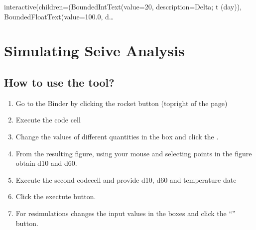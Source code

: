 \documentclass[letterpaper,10pt,english]{sphinxmanual}
\begin{document}
\begin{sphinxVerbatim}[commandchars=\\\{\}]
          
  \PYG{p}{[}\PYG{p}{]}  
\end{sphinxVerbatim}

\begin{sphinxVerbatim}[commandchars=\\\{\}]
interactive(children=(BoundedIntText(value=20, description=\PYGZsq{}\PYGZam{}Delta; t (day)\PYGZsq{}), BoundedFloatText(value=100.0, d…
\end{sphinxVerbatim}


\section{Simulating Seive Analysis}
\label{\detokenize{contents/tools/sieve_analysis:simulating-seive-analysis}}\label{\detokenize{contents/tools/sieve_analysis::doc}}

\subsection{How to use the tool?}
\label{\detokenize{contents/tools/sieve_analysis:how-to-use-the-tool}}\begin{enumerate}
%
\item {} 
Go to the Binder by clicking the rocket button (top\sphinxhyphen{}right of the page)

\item {} 
Execute the code cell

\item {} 
Change the values of different quantities in the box and click the .

\item {} 
From the resulting figure, using your mouse and selecting points in the figure obtain d10 and d60.

\item {} 
Execute the second code\sphinxhyphen{}cell and provide d10, d60 and temperature date

\item {} 
Click the exectute button.

\item {} 
For re\sphinxhyphen{}simulations \sphinxhyphen{} changes the input values in the boxes and click the “” button.

\end{enumerate}
\end{document}
